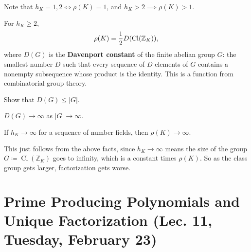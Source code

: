 \begin{remark}

Note that \(h_K = 1, 2\iff \rho(K) = 1\), and
\(h_K > 2 \implies \rho(K) > 1\).

\end{remark}

\begin{theorem}

For \(h_K \geq 2\),
\begin{align*}
\rho(K) = {1\over 2} D( \operatorname{Cl}( {\mathbb{Z}}_K))
,\end{align*}
where \(D(G)\) is the \textbf{Davenport constant} of the finite abelian
group \(G\): the smallest number \(D\) such that every sequence of \(D\)
elements of \(G\) contains a nonempty subsequence whose product is the
identity. This is a function from combinatorial group theory.

\end{theorem}

\begin{exercise}

Show that \(D(G) \leq {\left\lvert {G} \right\rvert}\).

\end{exercise}

\begin{fact}

\(D(G) \to \infty\) as \({\left\lvert {G} \right\rvert} \to \infty\).

\end{fact}

\begin{corollary}[?]

If \(h_K \to \infty\) for a sequence of number fields, then
\(\rho(K) \to \infty\).

\end{corollary}

\begin{remark}

This just follows from the above facts, since \(h_K \to \infty\) means
the size of the group \(G \coloneqq\operatorname{Cl}( {\mathbb{Z}}_K)\)
goes to infinity, which is a constant times \(\rho(K)\). So as the class
group gets larger, factorization gets worse.

\end{remark}

\hypertarget{prime-producing-polynomials-and-unique-factorization-lec.-11-tuesday-february-23}{%
\section{Prime Producing Polynomials and Unique Factorization (Lec. 11,
Tuesday, February
23)}\label{prime-producing-polynomials-and-unique-factorization-lec.-11-tuesday-february-23}}

